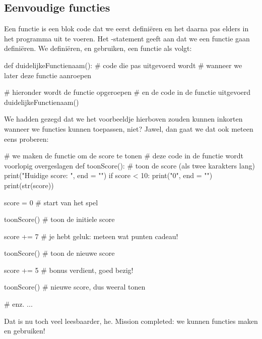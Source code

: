 \subsection{Eenvoudige functies}

Een functie is een blok code dat we eerst defini\"eren en het daarna pas elders in het programma uit te voeren.
Het -statement geeft aan dat we een functie gaan defini\"eren.
We defini\"eren, en gebruiken, een functie als volgt:
\begin{pyEnv}
def duidelijkeFunctienaam():
	# code die pas uitgevoerd wordt
	# wanneer we later deze functie aanroepen

# hieronder wordt de functie opgeroepen
# en de code in de functie uitgevoerd
duidelijkeFunctienaam()
\end{pyEnv}
We hadden gezegd dat we het voorbeeldje hierboven zouden kunnen inkorten
wanneer we functies kunnen toepassen, niet?
Jawel, dan gaat we dat ook meteen eens proberen:
\begin{pyEnv}
# we maken de functie om de score te tonen
# deze code in de functie wordt voorlopig overgeslagen
def toonScore():
	# toon de score (als twee karakters lang)
	print("Huidige score: ", end = "")
	if score < 10:
		print("0", end = "")
	print(str(score))

score = 0                   # start van het spel

toonScore()                 # toon de initiele score

score += 7                  # je hebt geluk: meteen wat punten cadeau!

toonScore()                 # toon de nieuwe score

score += 5                  # bonus verdient, goed bezig!

toonScore()                 # nieuwe score, dus weeral tonen

# enz. ...
\end{pyEnv}
Dat is nu toch veel leesbaarder, he.
\newline
Mission completed: we kunnen functies maken en gebruiken!

